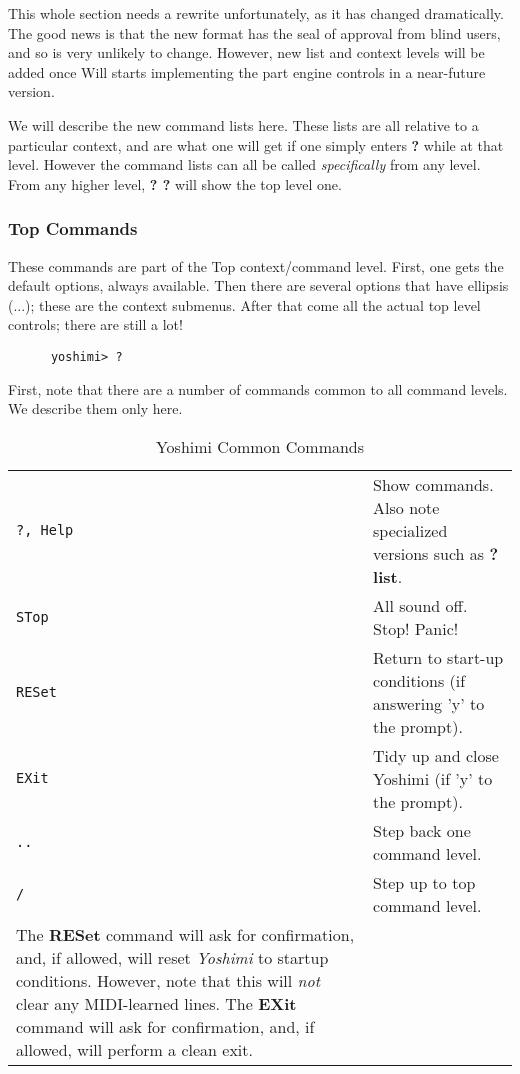   This whole section needs a rewrite unfortunately, as it has changed
   dramatically. The good news is that the new format has the seal of approval
   from blind users, and so is very unlikely to change. However, new list and
   context levels will be added once Will starts implementing the part engine
   controls in a near-future version.

   We will describe the new command lists here. These lists are all relative to
   a particular context, and are what one will get if one simply enters
   \textbf{?} while at that level.
   However the command lists can all be called \textsl{specifically} from any
   level. From any higher level, \textbf{? ?} will show the top level one.


\subsubsection{Top Commands}
\label{subsec:command_line_top_command_list}

   These commands are part of the Top context/command level.
   First, one gets the default options, always available.
   Then there are several options that have ellipsis (...);
   these are the context submenus.
   After that come all the actual top level controls; there are still a lot!

   \begin{verbatim}
      yoshimi> ?
   \end{verbatim}

   First, note that there are a number of commands common to all command levels.
   We describe them only here.

   \begin{table}[H]
      \centering
      \caption{Yoshimi Common Commands}
      \label{table:yoshimi_text_common_commands}
      \begin{tabular}{l l}

\texttt{?,  Help} &
   Show commands.  Also note specialized versions such as \textbf{? list}. \\
\texttt{STop} &
   All sound off.  Stop!  Panic! \\
\texttt{RESet} &
   Return to start-up conditions (if answering 'y' to the prompt). \\
\texttt{EXit} &
   Tidy up and close Yoshimi (if 'y' to the prompt). \\
\texttt{..} &
   Step back one command level. \\
\texttt{/} &
   Step up to top command level. \\

   The \textbf{RESet} command will ask for confirmation, and, if allowed, will
   reset \textsl{Yoshimi} to startup conditions.  However, note that this will
   \textsl{not} clear any MIDI-learned lines.
   The \textbf{EXit} command will ask for confirmation, and, if allowed, will
   perform a clean exit.

      \end{tabular}
   \end{table}

